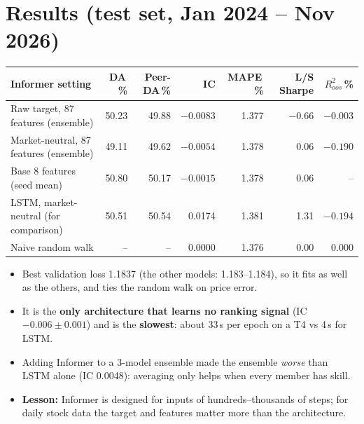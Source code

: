 \documentclass[10pt,a4paper]{article}
\begin{document}
\section{Results (test set, Jan 2024 -- Nov 2026)}
\begin{center}\footnotesize\setlength\tabcolsep{4pt}
\begin{tabular}{lrrrrrr}
\toprule
Informer setting & DA\,\% & Peer-DA\,\% & IC & MAPE\,\% & L/S Sharpe & $R^2_{oos}$\,\%\\\midrule
Raw target, 87 features (ensemble) & 50.23 & 49.88 & $-0.0083$ & 1.377 & $-0.66$ & $-0.003$\\
Market-neutral, 87 features (ensemble) & 49.11 & 49.62 & $-0.0054$ & 1.378 & 0.06 & $-0.190$\\
Base 8 features (seed mean) & 50.80 & 50.17 & $-0.0015$ & 1.378 & 0.06 & --\\
LSTM, market-neutral (for comparison) & 50.51 & 50.54 & 0.0174 & 1.381 & 1.31 & $-0.194$\\
Naive random walk & -- & -- & 0.0000 & 1.376 & 0.00 & 0.000\\\bottomrule
\end{tabular}
\end{center}
\begin{itemize}
  \item Best validation loss 1.1837 (the other models: 1.183--1.184), so it fits as well as the others, and ties the random walk on price error.
  \item It is the \textbf{only architecture that learns no ranking signal} (IC $-0.006\pm0.001$) and is the \textbf{slowest}: about 33\,s per epoch on a T4 vs 4\,s for LSTM.
  \item Adding Informer to a 3-model ensemble made the ensemble \emph{worse} than LSTM alone (IC 0.0048): averaging only helps when every member has skill.
  \item \textbf{Lesson:} Informer is designed for inputs of hundreds--thousands of steps; for daily stock data the target and features matter more than the architecture.
\end{itemize}
\end{document}

